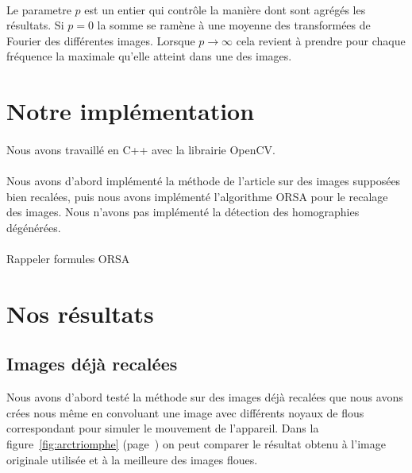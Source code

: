 \documentclass[a4paper,10pt]{report}
\begin{document}
\paragraph{}
Le parametre \(p\) est un entier qui contrôle la manière dont sont agrégés les résultats. Si \(p = 0\) la somme 
se ramène à une moyenne des transformées de Fourier des différentes images. Lorsque \(p \rightarrow \infty \) 
cela revient à prendre pour chaque fréquence la maximale qu'elle atteint dans une des images. 

\section{Notre implémentation }
\paragraph{}
Nous avons travaillé en C++ avec la librairie OpenCV.
\paragraph{}
Nous avons d'abord implémenté la méthode de l'article sur des images supposées bien recalées, puis
nous avons implémenté l'algorithme ORSA pour le recalage des images. 
Nous n'avons pas implémenté la détection des homographies dégénérées.
\\\\
Rappeler formules ORSA

\section{Nos résultats}

\subsection{Images déjà recalées}
Nous avons d'abord testé la méthode sur des images déjà recalées que nous avons crées
nous même en convoluant une image avec différents noyaux de flous correspondant pour simuler 
le mouvement de l'appareil. Dans la figure~\ref{fig:arctriomphe}
(page~\pageref{fig:arctriomphe}) on peut comparer le résultat obtenu à
l'image originale utilisée et à la meilleure des images floues.
\end{document}
